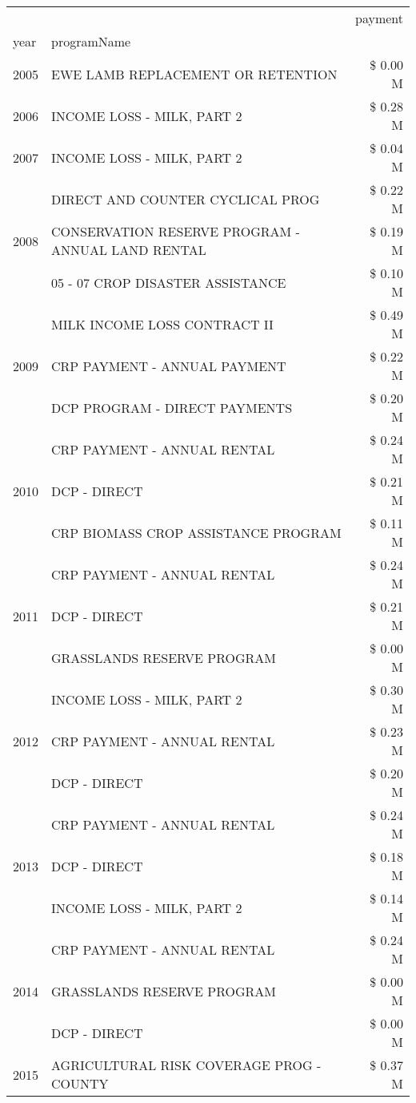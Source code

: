 \begin{tabular}{llr}
\toprule
 &  & payment \\
year & programName &  \\
\midrule
2005 & EWE LAMB REPLACEMENT OR RETENTION & \$ 0.00 M \\
\cline{1-3}
2006 & INCOME LOSS - MILK, PART 2 & \$ 0.28 M \\
\cline{1-3}
2007 & INCOME LOSS - MILK, PART 2 & \$ 0.04 M \\
\cline{1-3}
\multirow[t]{3}{*}{2008} & DIRECT AND COUNTER CYCLICAL PROG & \$ 0.22 M \\
 & CONSERVATION RESERVE PROGRAM - ANNUAL LAND RENTAL & \$ 0.19 M \\
 & 05 - 07 CROP DISASTER ASSISTANCE & \$ 0.10 M \\
\cline{1-3}
\multirow[t]{3}{*}{2009} & MILK INCOME LOSS CONTRACT II & \$ 0.49 M \\
 & CRP PAYMENT - ANNUAL PAYMENT & \$ 0.22 M \\
 & DCP PROGRAM - DIRECT PAYMENTS & \$ 0.20 M \\
\cline{1-3}
\multirow[t]{3}{*}{2010} & CRP PAYMENT - ANNUAL RENTAL & \$ 0.24 M \\
 & DCP - DIRECT & \$ 0.21 M \\
 & CRP BIOMASS CROP ASSISTANCE PROGRAM & \$ 0.11 M \\
\cline{1-3}
\multirow[t]{3}{*}{2011} & CRP PAYMENT - ANNUAL RENTAL & \$ 0.24 M \\
 & DCP - DIRECT & \$ 0.21 M \\
 & GRASSLANDS RESERVE PROGRAM & \$ 0.00 M \\
\cline{1-3}
\multirow[t]{3}{*}{2012} & INCOME LOSS - MILK, PART 2 & \$ 0.30 M \\
 & CRP PAYMENT - ANNUAL RENTAL & \$ 0.23 M \\
 & DCP - DIRECT & \$ 0.20 M \\
\cline{1-3}
\multirow[t]{3}{*}{2013} & CRP PAYMENT - ANNUAL RENTAL & \$ 0.24 M \\
 & DCP - DIRECT & \$ 0.18 M \\
 & INCOME LOSS - MILK, PART 2 & \$ 0.14 M \\
\cline{1-3}
\multirow[t]{3}{*}{2014} & CRP PAYMENT - ANNUAL RENTAL & \$ 0.24 M \\
 & GRASSLANDS RESERVE PROGRAM & \$ 0.00 M \\
 & DCP - DIRECT & \$ 0.00 M \\
\cline{1-3}
\multirow[t]{3}{*}{2015} & AGRICULTURAL RISK COVERAGE PROG - COUNTY & \$ 0.37 M \\

\end{tabular}
